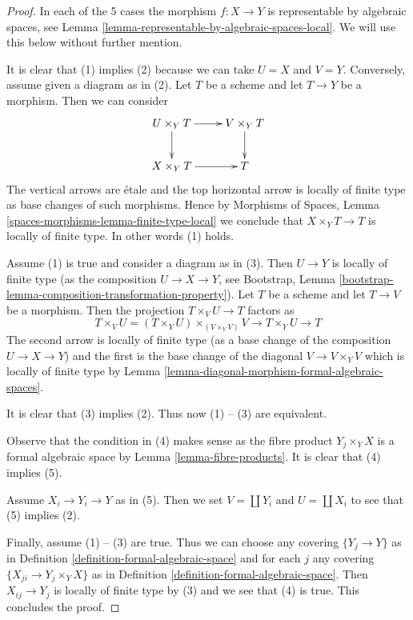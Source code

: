 \documentclass{stacks-project}
\theoremstyle{plain}
\theoremstyle{definition}
\theoremstyle{remark}
\numberwithin{equation}{subsection}
\begin{document}
\begin{proof}
In each of the 5 cases the morphism $f : X \to Y$ is representable
by algebraic spaces, see
Lemma \ref{lemma-representable-by-algebraic-spaces-local}.
We will use this below without further mention.

\medskip\noindent
It is clear that (1) implies (2) because we can take $U = X$ and $V = Y$.
Conversely, assume given a diagram as in (2). Let $T$ be a scheme and
let $T \to Y$ be a morphism. Then we can consider
$$
\xymatrix{
U \times_Y T \ar[d] \ar[r] & V \times_Y T \ar[d] \\
X \times_Y T \ar[r] & T
}
$$
The vertical arrows are \'etale and the top horizontal arrow
is locally of finite type as base changes of such morphisms.
Hence by Morphisms of Spaces, Lemma
\ref{spaces-morphisms-lemma-finite-type-local} we conclude that
$X \times_Y T \to T$ is locally of finite type. In other words
(1) holds.

\medskip\noindent
Assume (1) is true and consider a diagram as in (3).
Then $U \to Y$ is locally of finite type
(as the composition $U \to X \to Y$, see
Bootstrap, Lemma \ref{bootstrap-lemma-composition-transformation-property}).
Let $T$ be a scheme and let $T \to V$ be a morphism.
Then the projection $T \times_V U \to T$ factors as
$$
T \times_V U = (T \times_Y U) \times_{(V \times_Y V)} V
\to T \times_Y U \to T
$$
The second arrow is locally of finite type (as a base change
of the composition $U \to X \to Y$) and
the first is the base change of the diagonal $V \to V \times_Y V$
which is locally of finite type by
Lemma \ref{lemma-diagonal-morphism-formal-algebraic-spaces}.

\medskip\noindent
It is clear that (3) implies (2). Thus now (1) -- (3) are equivalent.

\medskip\noindent
Observe that the condition in (4) makes sense as the fibre product
$Y_j \times_Y X$ is a formal algebraic space by
Lemma \ref{lemma-fibre-products}.
It is clear that (4) implies (5).

\medskip\noindent
Assume $X_i \to Y_i \to Y$ as in (5). Then we set
$V = \coprod Y_i$ and $U = \coprod X_i$ to see that
(5) implies (2).

\medskip\noindent
Finally, assume (1) -- (3) are true.
Thus we can choose any covering $\{Y_j \to Y\}$ as in
Definition \ref{definition-formal-algebraic-space}
and for each $j$ any covering $\{X_{ji} \to Y_j \times_Y X\}$ as in
Definition \ref{definition-formal-algebraic-space}.
Then $X_{ij} \to Y_j$ is locally of finite type by (3)
and we see that (4) is true. This concludes the proof.
\end{proof}
\end{document}
